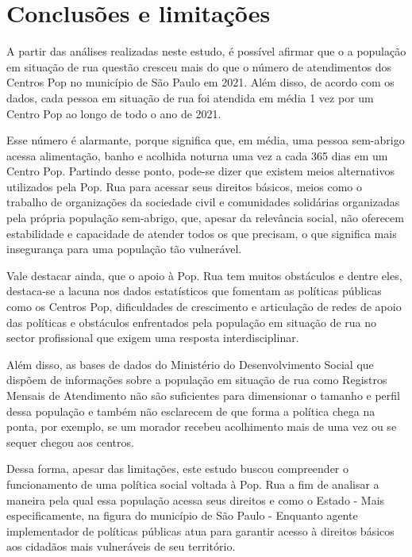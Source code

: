 \section{Conclusões e limitações}

A partir das análises realizadas neste estudo, é possível afirmar que o a população em situação de rua  questão cresceu mais do que o número de atendimentos dos Centros Pop no município de São Paulo em 2021. Além disso, de acordo com os dados, cada pessoa em situação de rua foi atendida em média 1 vez por um Centro Pop ao longo de todo o ano de 2021.

Esse número é alarmante, porque significa que, em média, uma pessoa sem-abrigo acessa alimentação, banho e acolhida noturna uma vez a cada 365 dias em um Centro Pop. Partindo desse ponto, pode-se dizer que existem meios alternativos utilizados pela Pop. Rua para acessar seus direitos básicos, meios como o trabalho de organizações da sociedade civil e comunidades solidárias organizadas pela própria população sem-abrigo, que, apesar da relevância social, não oferecem estabilidade e capacidade de atender todos os que precisam, o que significa mais insegurança para uma população tão vulnerável.

Vale destacar ainda, que o apoio à Pop. Rua tem muitos obstáculos e dentre eles, destaca-se a lacuna nos dados estatísticos que fomentam as políticas públicas como os Centros Pop, dificuldades de crescimento e articulação de redes de apoio das políticas e obstáculos enfrentados pela população em situação de rua no sector profissional que exigem uma resposta interdisciplinar. 

Além disso, as bases de dados do Ministério do Desenvolvimento Social que dispõem de informações sobre a população em situação de rua como Registros Mensais de Atendimento não são suficientes para dimensionar o tamanho e perfil dessa população e também não esclarecem de que forma a política chega na ponta, por exemplo, se um morador recebeu acolhimento mais de uma vez ou se sequer chegou aos centros. 

Dessa forma, apesar das limitações, este estudo buscou compreender o funcionamento de uma política social voltada à Pop. Rua a fim de analisar a maneira pela qual essa população acessa seus direitos e como o Estado - Mais especificamente, na figura do município de São Paulo - Enquanto agente implementador de políticas públicas atua para garantir acesso à direitos básicos aos cidadãos mais vulneráveis de seu território.


\printbibliography[keyword = pop-rua]

